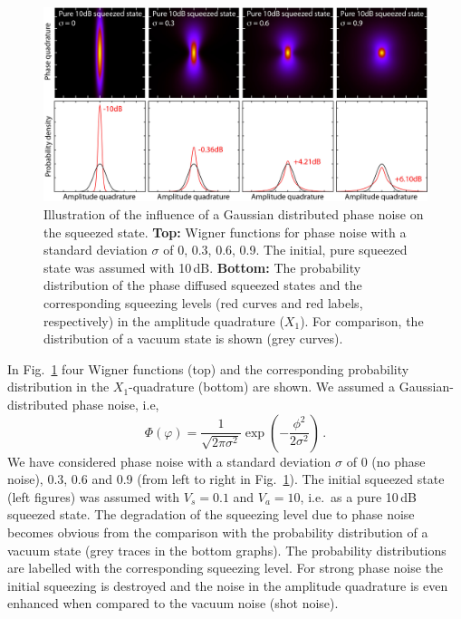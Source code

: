 \begin{figure}
\centering
\includegraphics[scale=0.77]{./Sec_Optics/Wig_10dB_all.jpg}
\caption{Illustration of the influence of a Gaussian distributed phase noise on the squeezed state. \textbf{Top:} Wigner functions for phase noise  with a standard deviation $\sigma$ of 0, 0.3, 0.6, 0.9. The initial, pure squeezed state was assumed with 10\,dB. \textbf{Bottom:} The probability distribution of the phase diffused squeezed states and the corresponding squeezing levels (red curves and red labels, respectively) in the  amplitude quadrature ($X_1$).  For comparison, the distribution of a vacuum state is shown (grey curves).}
\label{fig:phasediffusedSQZ}
\end{figure}

In Fig.~\ref{fig:phasediffusedSQZ} four Wigner functions  (top) and the corresponding probability distribution in the $X_1$-quadrature (bottom) are shown. We assumed a Gaussian-distributed phase noise, i.e,
\begin{equation}
\Phi(\varphi) = \frac{1}{\sqrt{2\pi\sigma^2}} \exp\left(-\frac{\phi^2}{2\sigma^2}\right)\,.
\end{equation}
We have considered phase noise with  a standard deviation $\sigma$ of 0 (no phase noise), 0.3, 0.6 and 0.9 (from left to right in Fig.~\ref{fig:phasediffusedSQZ}). The initial squeezed state (left figures) was assumed with $V_s=0.1$ and $V_a=10$, i.e.\ as a pure 10\,dB squeezed state. The degradation of the squeezing level due to phase noise becomes obvious from the comparison with the probability distribution of a vacuum state (grey traces in the bottom graphs). The probability distributions are labelled with the corresponding squeezing level. For strong phase noise  the initial squeezing is destroyed and the noise in the amplitude quadrature is even enhanced when compared to the vacuum noise (shot noise).

